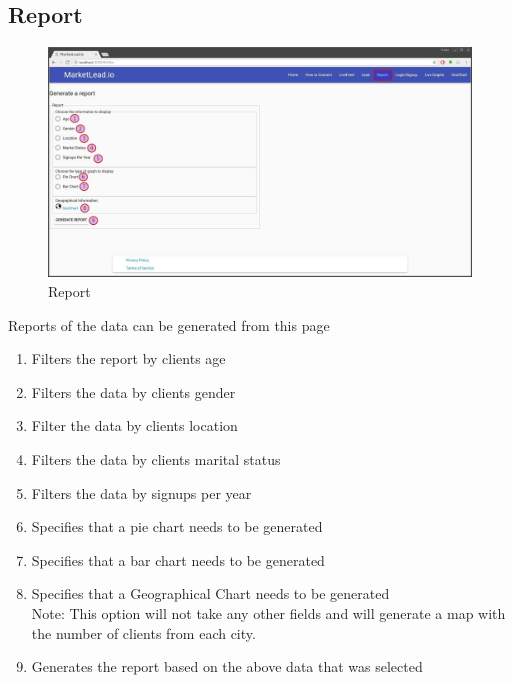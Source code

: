 \documentclass{article}
\begin{document}
		\subsection{Report}
			\begin{figure}[H]
				\includegraphics[width=\textwidth]{images/report.jpg}
				\caption{Report}
			\end{figure}
			Reports of the data can be generated from this page
			\begin{enumerate}
				\item Filters the report by clients age
				\item Filters the data by clients gender
				\item Filter the data by clients location
				\item Filters the data by clients marital status
				\item Filters the data by signups per year
				\item Specifies that a pie chart needs to be generated
				\item Specifies that a bar chart needs to be generated
				\item Specifies that a Geographical Chart needs to be generated\\
					Note: This option will not take any other fields and will generate a map with the number of clients from each city.
				\item Generates the report based on the above data that was selected
			\end{enumerate}
\end{document}
